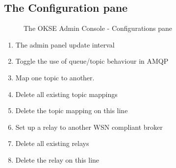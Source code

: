 \subsection{The Configuration pane}
\begin{center}
  \begin{figure}[ht!]
    \caption{The OKSE Admin Console - Configurations pane} 
    \label{fig:OKSE Admin Console - Configurations pane}
  \end{figure}
\end{center}
\begin{enumerate}
\item The admin panel update interval
\item Toggle the use of queue/topic behaviour in AMQP
\item Map one topic to another.
\item Delete all existing topic mappings
\item Delete the topic mapping on this line
\item Set up a relay to another WSN compliant broker
\item Delete all existing relays
\item Delete the relay on this line
\end{enumerate}


